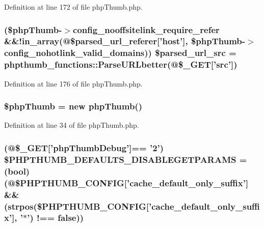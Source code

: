 \-Definition at line 172 of file php\-Thumb.\-php.

\hypertarget{php_thumb_8php_a34e071823656d093df510c217363bb61}{
\subsubsection[{\$parsed\-\_\-url\-\_\-src}]{ (\$php\-Thumb-\/$>$config\-\_\-nooffsitelink\-\_\-require\-\_\-refer \&\&!in\-\_\-array(@\$parsed\-\_\-url\-\_\-referer\mbox{[}'host'\mbox{]}, \$php\-Thumb-\/$>$config\-\_\-nohotlink\-\_\-valid\-\_\-domains)) \$parsed\-\_\-url\-\_\-src = {\bf phpthumb\-\_\-functions\-::\-Parse\-U\-R\-Lbetter}(@\$\-\_\-\-G\-E\-T\mbox{[}'src'\mbox{]})}}\label{php_thumb_8php_a34e071823656d093df510c217363bb61}


\-Definition at line 176 of file php\-Thumb.\-php.

\hypertarget{php_thumb_8php_a1102b627fc78f79861c9271417c605c5}{
\subsubsection[{\$php\-Thumb}]{\setlength{\rightskip}{0pt plus 5cm}\$php\-Thumb = new php\-Thumb()}}\label{php_thumb_8php_a1102b627fc78f79861c9271417c605c5}


\-Definition at line 34 of file php\-Thumb.\-php.

\hypertarget{php_thumb_8php_a173fd7202f9dac3c9d2e2fc80c512940}{
\subsubsection[{\$\-P\-H\-P\-T\-H\-U\-M\-B\-\_\-\-D\-E\-F\-A\-U\-L\-T\-S\-\_\-\-D\-I\-S\-A\-B\-L\-E\-G\-E\-T\-P\-A\-R\-A\-M\-S}]{ (@\$\-\_\-\-G\-E\-T\mbox{[}'php\-Thumb\-Debug'\mbox{]}== '2') \$\-P\-H\-P\-T\-H\-U\-M\-B\-\_\-\-D\-E\-F\-A\-U\-L\-T\-S\-\_\-\-D\-I\-S\-A\-B\-L\-E\-G\-E\-T\-P\-A\-R\-A\-M\-S = (bool) (@\$\-P\-H\-P\-T\-H\-U\-M\-B\-\_\-\-C\-O\-N\-F\-I\-G\mbox{[}'cache\-\_\-default\-\_\-only\-\_\-suffix'\mbox{]} \&\& (strpos(\$\-P\-H\-P\-T\-H\-U\-M\-B\-\_\-\-C\-O\-N\-F\-I\-G\mbox{[}'cache\-\_\-default\-\_\-only\-\_\-suffix'\mbox{]}, '$\ast$') !== false))}}\label{php_thumb_8php_a173fd7202f9dac3c9d2e2fc80c512940}


